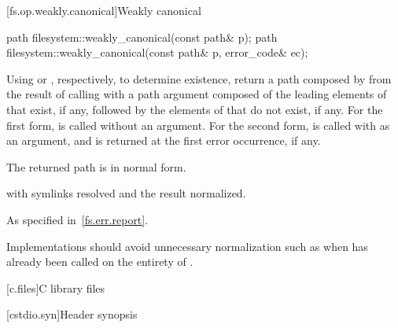 [fs.op.weakly.canonical]{Weakly canonical}

%
\begin{itemdecl}
path filesystem::weakly_canonical(const path& p);
path filesystem::weakly_canonical(const path& p, error_code& ec);
\end{itemdecl}

\begin{itemdescr}
\pnum
\effects
Using  or , respectively,
  to determine existence,
  return a path composed by 
  from the result of calling 
  with a path argument composed of
  the leading elements of  that exist, if any, followed by
  the elements of  that do not exist, if any.
  For the first form,
   is called without an  argument.
  For the second form,
   is called
  with  as an  argument, and
   is returned at the first error occurrence, if any.

\pnum
\ensures
The returned path is in normal form.

\pnum
\returns
{} with symlinks resolved and
  the result normalized.

\pnum
\throws
As specified in~\ref{fs.err.report}.

\pnum
\remarks
Implementations should
  avoid unnecessary normalization such as
  when  has already been called on the entirety of .
\end{itemdescr}

[c.files]{C library files}

[cstdio.syn]{Header  synopsis}

